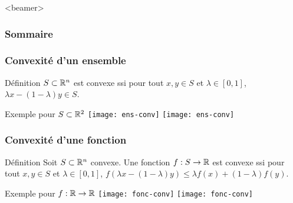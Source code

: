 \documentclass{beamer}
\newcommand{\R}{{\ensuremath\mathbb{R}}}
\begin{document}
\begin{frame}<beamer>
  \frametitle{Sommaire}
  \tableofcontents[currentsection]
\end{frame}


\begin{frame}
  \frametitle{Convexité d'un ensemble}

  \begin{block}{Définition}
    $S \subset \R^n$ est convexe ssi  
    pour tout $x,y \in S$ et $\lambda \in [0,1]$,
    $\lambda x - (1 - \lambda) y \in S$. 
  \end{block}

  \begin{exampleblock}{Exemple pour $S \subset \R^2$}
    \centering
    \texttt{[image: ens-conv]} \hspace{0.05\textwidth}
    \texttt{[image: ens-conv]}
  \end{exampleblock}
  
\end{frame}

\begin{frame}
  \frametitle{Convexité d'une fonction}

  \begin{block}{Définition}
     Soit $S \subset \R^n$ convexe.
     Une fonction $f : S \rightarrow \R$ est convexe ssi  
    pour tout $x,y \in S$ et $\lambda \in [0,1]$,
    $f(\lambda x - (1 - \lambda) y) \leq \lambda f(x) + (1 - \lambda) f(y)$. 
  \end{block}

  \begin{exampleblock}{Exemple pour $f:\R \rightarrow \R$}
    \centering
    \texttt{[image: fonc-conv]} \hspace{0.05\textwidth}
    \texttt{[image: fonc-conv]}
  \end{exampleblock}
  
\end{frame}


\end{document}
